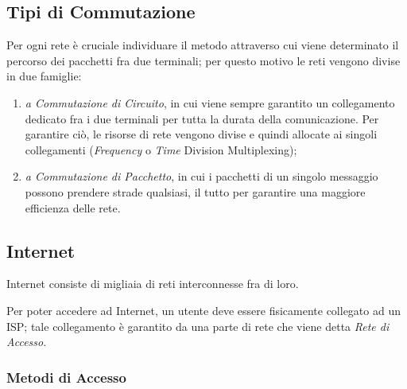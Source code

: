 \documentclass[a4paper]{article}
\begin{document}
	\newpage
	\subsection{Tipi di Commutazione}
	
		Per ogni rete è cruciale individuare il metodo attraverso cui viene determinato il percorso dei pacchetti fra due terminali; per questo motivo le reti vengono divise in due famiglie:
		\begin{enumerate}
			\item \emph{a Commutazione di Circuito}, in cui viene sempre garantito un collegamento dedicato fra i due terminali per tutta la durata della comunicazione. Per garantire ciò, le risorse di rete vengono divise e quindi allocate ai singoli collegamenti (\emph{Frequency} o \emph{Time} Division Multiplexing);
			\item \emph{a Commutazione di Pacchetto}, in cui i pacchetti di un singolo messaggio possono prendere strade qualsiasi, il tutto per garantire una maggiore efficienza delle rete.
		\end{enumerate}
		
	\subsection{Internet}
	
		Internet consiste di migliaia di reti interconnesse fra di loro.
		
		Per poter accedere ad Internet, un utente deve essere fisicamente collegato ad un ISP; tale collegamento è garantito da una parte di rete che viene detta \emph{Rete di Accesso}.
		
		\subsubsection{Metodi di Accesso}
			
\end{document}
